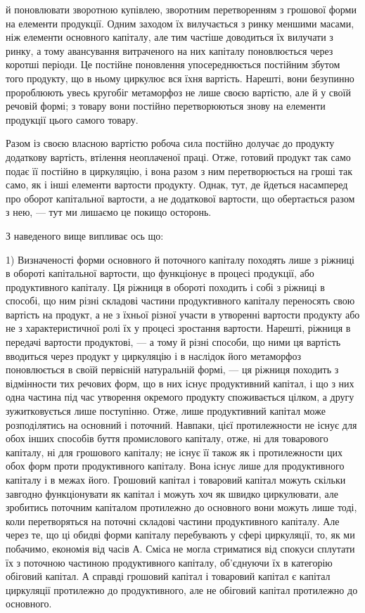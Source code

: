 \parcont{}  %
й поновлювати зворотною купівлею, зворотним перетворенням з грошової форми на елементи продукції.
Одним заходом їх вилучається з ринку меншими масами, ніж елементи основного капіталу, але тим
частіше доводиться їх вилучати з ринку, а тому авансування витраченого на них капіталу поновлюється
через коротші періоди. Це постійне поновлення упосереднюється постійним збутом того продукту, що в
ньому циркулює вся їхня вартість. Нарешті, вони безупинно пророблюють увесь кругобіг метаморфоз не
лише своєю вартістю, але й у своїй речовій формі; з товару вони постійно перетворюються знову на
елементи продукції цього самого товару.

Разом із своєю власною вартістю робоча сила постійно долучає до продукту додаткову вартість,
втілення неоплаченої праці. Отже, готовий продукт так само подає її постійно в циркуляцію, і вона
разом з ним перетворюється на гроші так само, як і інші елементи вартости продукту. Однак, тут, де
йдеться насамперед про оборот капітальної вартости, а не додаткової вартости, що обертається разом з
нею, — тут ми лишаємо це покищо осторонь.

З наведеного вище випливає ось що:

1) Визначеності форми основного й поточного капіталу походять лише з ріжниці в обороті капітальної
вартости, що функціонує в процесі продукції, або продуктивного капіталу. Ця ріжниця в обороті
походить і собі з ріжниці в способі, що ним різні складові частини продуктивного капіталу переносять
свою вартість на продукт, а не з їхньої різної участи в утворенні вартости продукту або не з
характеристичної ролі їх у процесі зростання вартости. Нарешті, ріжниця в передачі вартости
продуктові, — а тому й різні способи, що ними ця вартість вводиться через продукт у циркуляцію і в
наслідок його метаморфоз поновлюється в своїй первісній натуральній формі, — ця ріжниця походить з
відмінности тих речових форм, що в них існує продуктивний капітал, і що з них одна частина під час
утворення окремого продукту споживається цілком, а другу зужитковується лише поступінно. Отже, лише
продуктивний капітал може розподілятись на основний і поточний. Навпаки, цієї протилежности не існує
для обох інших способів буття промислового капіталу, отже, ні для товарового капіталу, ні для
грошового капіталу; не існує її також як і протилежности цих обох форм проти продуктивного капіталу.
Вона існує лише для продуктивного капіталу і в межах його. Грошовий капітал і товаровий капітал
можуть скільки завгодно функціонувати як капітал і можуть хоч як швидко циркулювати, але зробитись
поточним капіталом протилежно до основного вони можуть лише тоді, коли перетворяться на поточні
складові частини продуктивного капіталу. Але через те, що ці обидві форми капіталу перебувають у
сфері циркуляції, то, як ми побачимо, економія від часів А. Сміса не могла стриматися від спокуси
сплутати їх з поточною частиною продуктивного капіталу, об’єднуючи їх в категорію обіговий капітал.
А справді грошовий капітал і товаровий капітал є капітал циркуляції протилежно до продуктивного, але
не обіговий капітал протилежно до основного.
